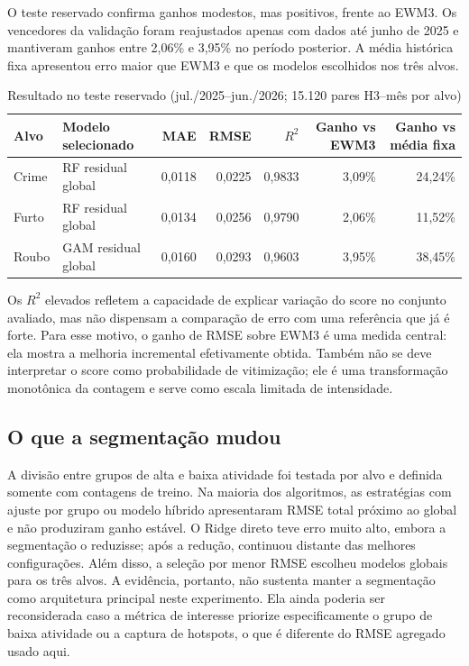 \documentclass[12pt]{article}
\begin{document}
O teste reservado confirma ganhos modestos, mas positivos, frente ao EWM3. Os vencedores da validação foram reajustados apenas com dados até junho de 2025 e mantiveram ganhos entre 2,06\% e 3,95\% no período posterior. A média histórica fixa apresentou erro maior que EWM3 e que os modelos escolhidos nos três alvos.

\begin{table}[!ht]
\centering
\caption{Resultado no teste reservado (jul./2025--jun./2026; 15.120 pares H3--mês por alvo)}
\label{tab:teste}
\scriptsize
\renewcommand{\arraystretch}{1.15}
\begin{tabular}{l l r r r r r}
\toprule
Alvo & Modelo selecionado & MAE & RMSE & $R^2$ & Ganho vs EWM3 & Ganho vs média fixa \\
\midrule
Crime & RF residual global & 0,0118 & 0,0225 & 0,9833 & 3,09\% & 24,24\% \\
Furto & RF residual global & 0,0134 & 0,0256 & 0,9790 & 2,06\% & 11,52\% \\
Roubo & GAM residual global & 0,0160 & 0,0293 & 0,9603 & 3,95\% & 38,45\% \\
\bottomrule
\end{tabular}
\end{table}

Os $R^2$ elevados refletem a capacidade de explicar variação do score no conjunto avaliado, mas não dispensam a comparação de erro com uma referência que já é forte. Para esse motivo, o ganho de RMSE sobre EWM3 é uma medida central: ela mostra a melhoria incremental efetivamente obtida. Também não se deve interpretar o score como probabilidade de vitimização; ele é uma transformação monotônica da contagem e serve como escala limitada de intensidade.

\subsection{O que a segmentação mudou}

A divisão entre grupos de alta e baixa atividade foi testada por alvo e definida somente com contagens de treino. Na maioria dos algoritmos, as estratégias com ajuste por grupo ou modelo híbrido apresentaram RMSE total próximo ao global e não produziram ganho estável. O Ridge direto teve erro muito alto, embora a segmentação o reduzisse; após a redução, continuou distante das melhores configurações. Além disso, a seleção por menor RMSE escolheu modelos globais para os três alvos. A evidência, portanto, não sustenta manter a segmentação como arquitetura principal neste experimento. Ela ainda poderia ser reconsiderada caso a métrica de interesse priorize especificamente o grupo de baixa atividade ou a captura de hotspots, o que é diferente do RMSE agregado usado aqui.
\end{document}
